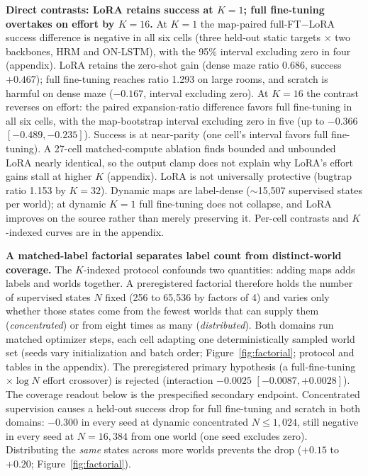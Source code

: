 \documentclass[letterpaper]{article} %
\begin{document}
\textbf{Direct contrasts: LoRA retains success at $K{=}1$; full fine-tuning overtakes on effort by $K{=}16$.} At $K{=}1$ the map-paired full-FT$-$LoRA success difference is negative in all six cells (three held-out static targets $\times$ two backbones, HRM and ON-LSTM), with the 95\% interval excluding zero in four (appendix). LoRA retains the zero-shot gain (dense maze ratio 0.686, success $+0.467$); full fine-tuning reaches ratio 1.293 on large rooms, and scratch is harmful on dense maze ($-0.167$, interval excluding zero). At $K{=}16$ the contrast reverses on effort: the paired expansion-ratio difference favors full fine-tuning in all six cells, with the map-bootstrap interval excluding zero in five (up to $-0.366$ $[-0.489,-0.235]$). Success is at near-parity (one cell's interval favors full fine-tuning). A 27-cell matched-compute ablation finds bounded and unbounded LoRA nearly identical, so the output clamp does not explain why LoRA's effort gains stall at higher $K$ (appendix). LoRA is not universally protective (bugtrap ratio 1.153 by $K{=}32$). Dynamic maps are label-dense ($\sim$15{,}507 supervised states per world); at dynamic $K{=}1$ full fine-tuning does not collapse, and LoRA improves on the source rather than merely preserving it. Per-cell contrasts and $K$-indexed curves are in the appendix.

\textbf{A matched-label factorial separates label count from distinct-world coverage.} The $K$-indexed protocol confounds two quantities: adding maps adds labels and worlds together. A preregistered factorial therefore holds the number of supervised states $N$ fixed (256 to 65{,}536 by factors of 4) and varies only whether those states come from the fewest worlds that can supply them (\emph{concentrated}) or from eight times as many (\emph{distributed}). Both domains run matched optimizer steps, each cell adapting one deterministically sampled world set (seeds vary initialization and batch order; Figure~\ref{fig:factorial}; protocol and tables in the appendix). The preregistered primary hypothesis (a full-fine-tuning$\times\log N$ effort crossover) is rejected (interaction $-0.0025$ $[-0.0087, +0.0028]$). The coverage readout below is the prespecified secondary endpoint. Concentrated supervision causes a held-out success drop for full fine-tuning and scratch in both domains: $-0.300$ in every seed at dynamic concentrated $N \leq 1{,}024$, still negative in every seed at $N{=}16{,}384$ from one world (one seed excludes zero). Distributing the \emph{same} states across more worlds prevents the drop ($+0.15$ to $+0.20$; Figure~\ref{fig:factorial}).
\end{document}
